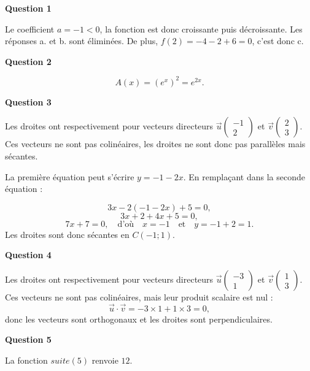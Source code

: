 \textbf{Question 1}
	
	Le coefficient $a = -1 < 0$, la fonction est donc croissante puis décroissante. Les réponses a. et b. sont éliminées. De plus, $f(2) = -4 - 2 + 6 = 0$, c’est donc c.
	
	\textbf{Question 2}
	
	\[
	A(x) = (e^x)^2 = e^{2x}.
	\]
	
	\textbf{Question 3}
	
	Les droites ont respectivement pour vecteurs directeurs $\overrightarrow{u}\left(\begin{array}{c}-1 \\ 2\end{array}\right)$ et $\overrightarrow{v}\left(\begin{array}{c}2 \\ 3\end{array}\right)$. Ces vecteurs ne sont pas colinéaires, les droites ne sont donc pas parallèles mais sécantes.
	
	La première équation peut s’écrire $y = -1 - 2x$. En remplaçant dans la seconde équation :
	
	\[
	3x - 2(-1 - 2x) + 5 = 0,
	\]
	\[
	3x + 2 + 4x + 5 = 0,
	\]
	\[
	7x + 7 = 0, \quad \text{d’où} \quad x = -1 \quad \text{et} \quad y = -1 + 2 = 1.
	\]
	Les droites sont donc sécantes en $C(-1; 1)$.
	
	\textbf{Question 4}
	
	Les droites ont respectivement pour vecteurs directeurs $\overrightarrow{u}\left(\begin{array}{c}-3 \\ 1\end{array}\right)$ et $\overrightarrow{v}\left(\begin{array}{c}1 \\ 3\end{array}\right)$. Ces vecteurs ne sont pas colinéaires, mais leur produit scalaire est nul :
	\[
	\overrightarrow{u} \cdot \overrightarrow{v} = -3 \times 1 + 1 \times 3 = 0,
	\]
	donc les vecteurs sont orthogonaux et les droites sont perpendiculaires.
	
	\textbf{Question 5}
	
	La fonction $suite(5)$ renvoie $12$.
